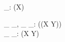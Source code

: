 

\begin{gendef}[X]
	\finset \_: \power (\power X)
\end{gendef}
\begin{gendef}[X,Y]
	\_ \rel \_, \_ \ffun \_: \power (\power (X \cross Y)) \\
	\_ \fun \_: \power (X \pfun Y)
\end{gendef}

